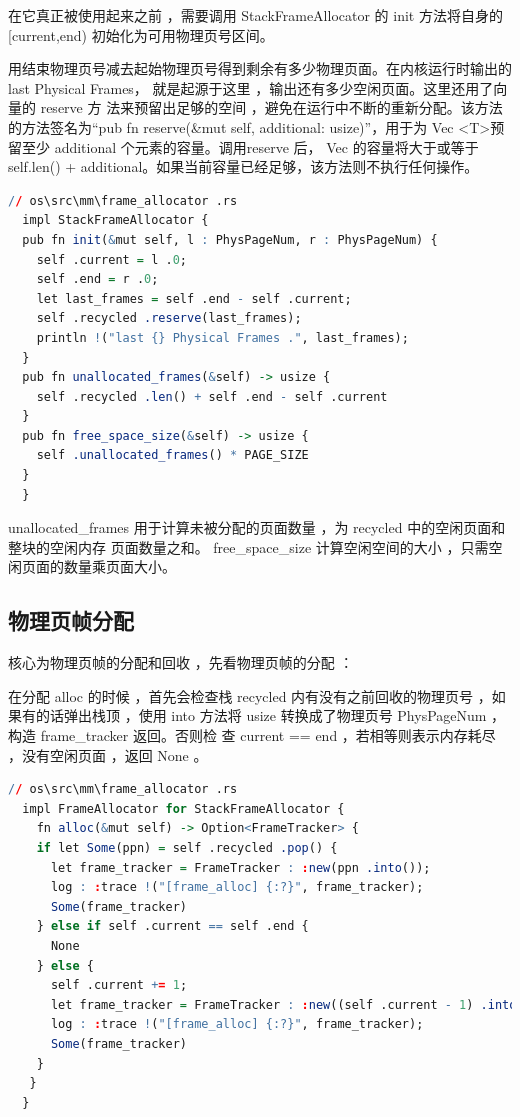 	在它真正被使用起来之前 ，需要调用 StackFrameAllocator 的  init 方法将自身的  [current,end) 初始化为可用物理页号区间。
	
	用结束物理页号减去起始物理页号得到剩余有多少物理页面。在内核运行时输出的 last {} Physical Frames， 就是起源于这里 ，输出还有多少空闲页面。这里还用了向量的 reserve 方 法来预留出足够的空间 ，避免在运行中不断的重新分配。该方法的方法签名为“pub fn reserve(\&mut self, additional: usize)”，用于为 Vec \textless T\textgreater 预留至少 additional 个元素的容量。调用reserve 后， Vec 的容量将大于或等于 self.len() + additional。如果当前容量已经足够，该方法则不执行任何操作。
	
\begin{lstlisting}[language=R]
  // os\src\mm\frame_allocator .rs
  impl StackFrameAllocator {
  pub fn init(&mut self, l : PhysPageNum, r : PhysPageNum) {
    self .current = l .0;
    self .end = r .0;
    let last_frames = self .end - self .current;
    self .recycled .reserve(last_frames);
    println !("last {} Physical Frames .", last_frames);
  }
  pub fn unallocated_frames(&self) -> usize {
    self .recycled .len() + self .end - self .current
  }
  pub fn free_space_size(&self) -> usize {
    self .unallocated_frames() * PAGE_SIZE
  }
  }
\end{lstlisting}
	
	unallocated\_frames 用于计算未被分配的页面数量 ，为 recycled 中的空闲页面和整块的空闲内存 页面数量之和。   free\_space\_size 计算空闲空间的大小 ，只需空闲页面的数量乘页面大小。
	\subsection{物理页帧分配}
	核心为物理页帧的分配和回收 ，先看物理页帧的分配 ：
	
	在分配  alloc 的时候 ，首先会检查栈  recycled 内有没有之前回收的物理页号 ，如果有的话弹出栈顶 ，使用  into 方法将  usize 转换成了物理页号  PhysPageNum ，构造 frame\_tracker 返回。否则检 查 current ==  end ，若相等则表示内存耗尽 ，没有空闲页面 ，返回 None 。
\begin{lstlisting}[language=R]
  // os\src\mm\frame_allocator .rs
  impl FrameAllocator for StackFrameAllocator {
    fn alloc(&mut self) -> Option<FrameTracker> {
	if let Some(ppn) = self .recycled .pop() {
	  let frame_tracker = FrameTracker : :new(ppn .into());
	  log : :trace !("[frame_alloc] {:?}", frame_tracker);
	  Some(frame_tracker)
	} else if self .current == self .end {
	  None
	} else {
	  self .current += 1;
	  let frame_tracker = FrameTracker : :new((self .current - 1) .into());
	  log : :trace !("[frame_alloc] {:?}", frame_tracker);
	  Some(frame_tracker)
	}
   }
  }
\end{lstlisting}
	
